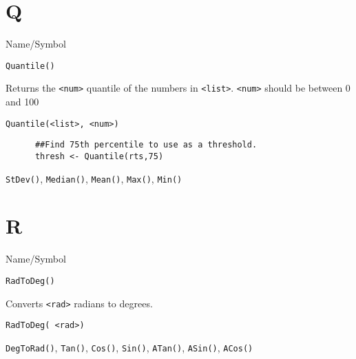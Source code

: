 \rl




\section{Q}
\rl

\begin{desc}{Name/Symbol}
\item[Name/Symbol]	\verb+Quantile()+

\item[Description]	Returns the \verb+<num>+ quantile of
		the numbers in \verb+<list>+. \verb+<num>+ should be  between
        0 and 100

\item[Usage]		
\begin{verbatim}
Quantile(<list>, <num>)
\end{verbatim}

\item[Example]	
 \begin{verbatim}
      ##Find 75th percentile to use as a threshold.
      thresh <- Quantile(rts,75) 
 \end{verbatim}
\item[See Also]	\verb+StDev()+, \verb+Median()+, \verb+Mean()+, \verb+Max()+, \verb+Min()+
\end{desc}

\rl


\section{R}
\rl


\begin{desc}{Name/Symbol}
\item[Name/Symbol] 	\verb+RadToDeg()+ 

\item[Description] 	Converts \verb+<rad>+ radians to degrees.

\item[Usage]		
\begin{verbatim}
RadToDeg( <rad>)			 
\end{verbatim}

\item[Example]	

\item[See Also]     	\verb+DegToRad()+, \verb+Tan()+, \verb+Cos()+, \verb+Sin()+, \verb+ATan()+, \verb+ASin()+, \verb+ACos()+
\end{desc}

\rl



